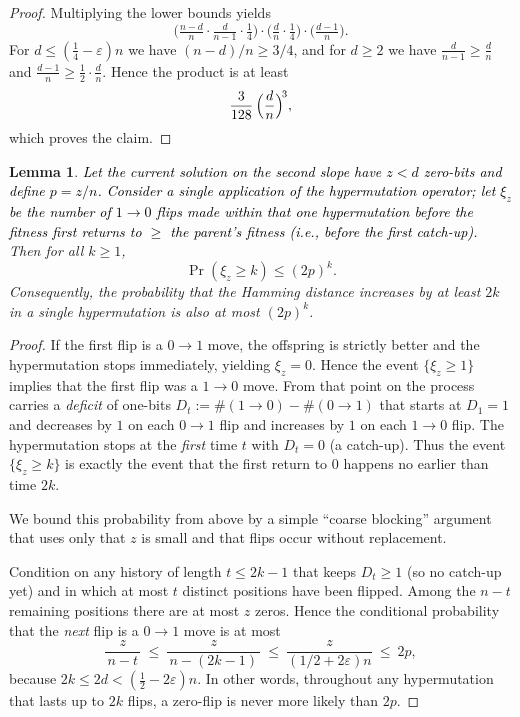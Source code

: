 \documentclass[lettersize,journal]{IEEEtran}
\newcommand{\rerev}[1]{\textcolor{black}{#1}}
\newtheorem{lemma}{Lemma}
\begin{document}
{\begin{proof}
	Multiplying the lower bounds yields
	\[
	\Big(\tfrac{n-d}{n}\cdot\tfrac{d}{n-1}\cdot\tfrac14\Big)\cdot
	\Big(\tfrac{d}{n}\cdot\tfrac14\Big)\cdot
	\Big(\tfrac{d-1}{n}\Big).
	\]
	For $d\le(\tfrac14-\varepsilon)n$ we have $(n-d)/n\ge 3/4$, and for $d\ge 2$ we have $\tfrac{d}{n-1}\ge\tfrac{d}{n}$ and $\tfrac{d-1}{n}\ge \tfrac12\cdot\tfrac{d}{n}$. Hence the product is at least
	\[
	\rerev{\frac{3}{128}}\,\Big(\frac{d}{n}\Big)^{\!3},
	\]
	which proves the claim.
\end{proof}



\setcounter{theorem}{4}
\begin{lemma}%
	\textcolor{black}{Let the current solution on the second slope have \rerev{$z< d$} zero-bits and
	define $p=z/n$.
	Consider a single application of the hypermutation operator; let $\xi_z$ be
	the number of $1\to0$ flips made \emph{within that one hypermutation} before
	the fitness first returns to $\ge$ the parent's fitness (i.e., before the
	first catch-up).}
	Then for all $k\ge1$,
	\[
	\Pr(\xi_z\ge k)\le (2p)^k.
	\]
	Consequently, the probability that the Hamming distance increases by at least 
	$2k$ in a single hypermutation is also at most $(2p)^k$.
\end{lemma}

\begin{proof}
	If the first flip is a $0\!\to 1$ move, the offspring is strictly better and the hypermutation stops immediately, yielding $\xi_z=0$. Hence the event $\{\xi_z\ge 1\}$ implies that the first flip was a $1\!\to 0$ move. From that point on the process carries a \emph{deficit} of one-bits $D_t:=\#(1\!\to 0)-\#(0\!\to 1)$ that starts at $D_1=1$ and decreases by $1$ on each $0\!\to 1$ flip and increases by $1$ on each $1\!\to 0$ flip. The hypermutation stops at the \emph{first} time $t$ with $D_t=0$ (a catch-up). Thus the event $\{\xi_z\ge k\}$ is exactly the event that the first return to $0$ happens no earlier than time $2k$.
	
	We bound this probability from above by a simple ``coarse blocking'' argument that uses only that $z$ is small and that flips occur without replacement.
	
	\smallskip
	Condition on any history of length $t\le 2k-1$ that keeps $D_t\ge 1$ (so no catch-up yet) and in which at most $t$ distinct positions have been flipped. Among the $n-t$ remaining positions there are at most $z$ zeros. Hence the conditional probability that the \emph{next} flip is a $0\!\to 1$ move is at most
	\begin{equation}\label{eq:zero-flip-bound}
	\frac{z}{\,n-t\,}\ \le\ \frac{z}{\,n-(2k-1)\,}\ \le\ \frac{z}{(1/2+2\varepsilon)n}\ \le\ 2p,
	\end{equation}
	because $2k\le 2d<(\tfrac12-2\varepsilon)n$. In other words, throughout any hypermutation that lasts up to $2k$ flips, a zero-flip is never more likely than $2p$.
	

\end{proof}}
\end{document}
